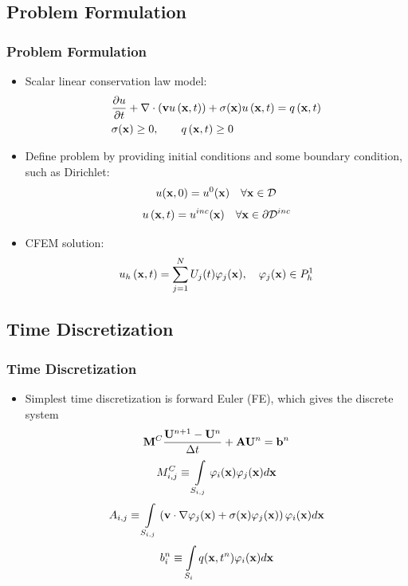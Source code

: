 \documentclass{beamer}
\begin{document}
\subsection{Problem Formulation}
\begin{frame}
\frametitle{Problem Formulation}

\begin{itemize}
   \item Scalar linear conservation law model:
   \begin{align}
      &\frac{\partial u}{\partial t} + \nabla\cdot(\mathbf{v} u\left(\mathbf{x},t\right))
      + \sigma(\mathbf{x})u\left(\mathbf{x},t\right) = q\left(\mathbf{x},t\right)\\
      &\sigma(\mathbf{x})\ge 0,\qquad q\left(\mathbf{x},t\right)\ge 0\nonumber
   \end{align}
   \item Define problem by providing initial conditions and some boundary
      condition, such as Dirichlet:
   \begin{equation}
      u(\mathbf{x},0) = u^0(\mathbf{x}) \quad \forall \mathbf{x}\in \mathcal{D}
   \end{equation}
   \begin{equation}
      u\left(\mathbf{x},t\right) = u^{inc}(\mathbf{x}) \quad \forall \mathbf{x}\in \partial \mathcal{D}^{inc}
   \end{equation}
   \item CFEM solution:
   \begin{equation}
      u_h\left(\mathbf{x},t\right) = \sum\limits_{j=1}^N U_j(t) \varphi_j(\mathbf{x}),
      \quad \varphi_j(\mathbf{x})\in P^1_h
   \end{equation}
\end{itemize}

\end{frame}
\subsection{Time Discretization}
\begin{frame}
\frametitle{Time Discretization}

\begin{itemize}
   \item Simplest time discretization is forward Euler (FE), which gives the
      discrete system
   \begin{equation}
      \consistentmassmatrix\frac{\solutionvector^{n+1}-\solutionvector^n}
        {\dt} + \ssmatrix\solutionvector^n = \ssrhs^n
   \end{equation}
   \begin{equation}
      M_{i,j}^C \equiv \int\limits_{S_{i,j}}\varphi_i(\mathbf{x}) \varphi_j(\mathbf{x}) d\mathbf{x}
   \end{equation}
   \begin{equation}
      A_{i,j} \equiv \int\limits_{S_{i,j}}\left(
      \mathbf{v}\cdot\nabla\varphi_j(\mathbf{x}) +
		\sigma(\mathbf{x})\varphi_j(\mathbf{x})\right)\varphi_i(\mathbf{x}) d\mathbf{x}
   \end{equation}
   \begin{equation}
      b_i^n \equiv \int\limits_{S_i} q(\mathbf{x},t^n)\varphi_i(\mathbf{x}) d\mathbf{x}
   \end{equation}
\end{itemize}

\end{frame}
\end{document}
